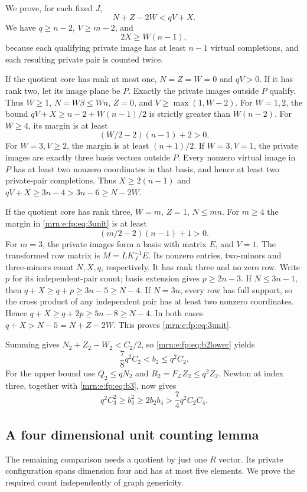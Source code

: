 \documentclass[11pt,a4paper]{article}
\theoremstyle{remark}\newtheorem{remark}[theorem]{Remark}
\begin{document}
We prove, for each fixed $J$,
\begin{equation}\label{mrn:e:fp:eq:3unit}
 N+Z-2W<qV+X.
\end{equation}
We have $q\ge n-2$, $V\ge m-2$, and
\[
 2X\ge W(n-1),
\]
because each qualifying private image has at least $n-1$ virtual completions, and each resulting private pair is counted twice.

If the quotient core has rank at most one, $N=Z=W=0$ and $qV>0$. If it has rank two, let its image plane be $P$. Exactly the private images outside $P$ qualify. Thus $W\ge1$, $N=W\beta\le Wn$, $Z=0$, and $V\ge\max(1,W-2)$. For $W=1,2$, the bound $qV+X\ge n-2+W(n-1)/2$ is strictly greater than $W(n-2)$. For $W\ge4$, its margin is at least
\[
 (W/2-2)(n-1)+2>0.
\]
For $W=3,V\ge2$, the margin is at least $(n+1)/2$. If $W=3,V=1$, the private images are exactly three basis vectors outside $P$. Every nonzero virtual image in $P$ has at least two nonzero coordinates in that basis, and hence at least two private-pair completions. Thus $X\ge2(n-1)$ and $qV+X\ge3n-4>3n-6\ge N-2W$.

If the quotient core has rank three, $W=m$, $Z=1$, $N\le mn$. For $m\ge4$ the margin in \eqref{mrn:e:fp:eq:3unit} is at least
\[
 (m/2-2)(n-1)+1>0.
\]
For $m=3$, the private images form a basis with matrix $E$, and $V=1$. The transformed row matrix is $M=L K_J^{-1}E$. Its nonzero entries, two-minors and three-minors count $N,X,q$, respectively. It has rank three and no zero row. Write $p$ for its independent-pair count; basis extension gives $p\ge2n-3$. If $N\le3n-1$, then $q+X\ge q+p\ge3n-5\ge N-4$. If $N=3n$, every row has full support, so the cross product of any independent pair has at least two nonzero coordinates. Hence $q+X\ge q+2p\ge5n-8\ge N-4$. In both cases $q+X>N-5=N+Z-2W$. This proves \eqref{mrn:e:fp:eq:3unit}.

Summing gives $N_2+Z_2-W_2<C_2/2$, so \eqref{mrn:e:fp:eq:b2lower} yields
\begin{equation}\label{mrn:e:fp:eq:b2bounds}
 \frac78q^2C_2<b_2\le q^2C_2.
\end{equation}
For the upper bound use $Q_2\le qN_2$ and $R_2=F_{\mathcal L}Z_2\le q^2Z_2$. Newton at index three, together with \eqref{mrn:e:fp:eq:b3}, now gives
\[
 q^2C_3^2\ge b_3^2\ge2b_2b_4>\frac74q^2C_2C_4.
\]

\subsection{A four dimensional unit counting lemma}
The remaining comparison needs a quotient by just one $R$ vector. Its private configuration spans dimension four and has at most five elements. We prove the required count independently of graph genericity.
\end{document}
